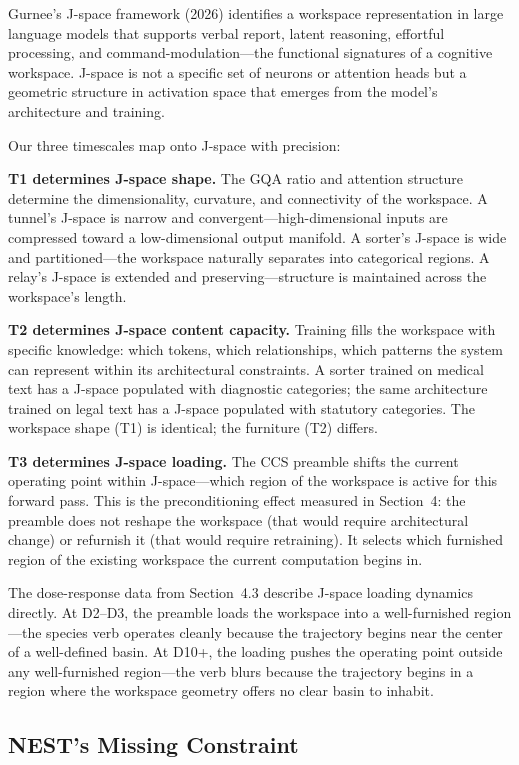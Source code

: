 \documentclass[12pt]{article}
\begin{document}
Gurnee's J-space framework (2026) identifies a workspace representation in large language models that supports verbal report, latent reasoning, effortful processing, and command-modulation---the functional signatures of a cognitive workspace. J-space is not a specific set of neurons or attention heads but a geometric structure in activation space that emerges from the model's architecture and training.

Our three timescales map onto J-space with precision:

\textbf{T1 determines J-space shape.} The GQA ratio and attention structure determine the dimensionality, curvature, and connectivity of the workspace. A tunnel's J-space is narrow and convergent---high-dimensional inputs are compressed toward a low-dimensional output manifold. A sorter's J-space is wide and partitioned---the workspace naturally separates into categorical regions. A relay's J-space is extended and preserving---structure is maintained across the workspace's length.

\textbf{T2 determines J-space content capacity.} Training fills the workspace with specific knowledge: which tokens, which relationships, which patterns the system can represent within its architectural constraints. A sorter trained on medical text has a J-space populated with diagnostic categories; the same architecture trained on legal text has a J-space populated with statutory categories. The workspace shape (T1) is identical; the furniture (T2) differs.

\textbf{T3 determines J-space loading.} The CCS preamble shifts the current operating point within J-space---which region of the workspace is active for this forward pass. This is the preconditioning effect measured in Section~4: the preamble does not reshape the workspace (that would require architectural change) or refurnish it (that would require retraining). It selects which furnished region of the existing workspace the current computation begins in.

The dose-response data from Section~4.3 describe J-space loading dynamics directly. At D2--D3, the preamble loads the workspace into a well-furnished region---the species verb operates cleanly because the trajectory begins near the center of a well-defined basin. At D10+, the loading pushes the operating point outside any well-furnished region---the verb blurs because the trajectory begins in a region where the workspace geometry offers no clear basin to inhabit.

\subsection{NEST's Missing Constraint}
\end{document}
